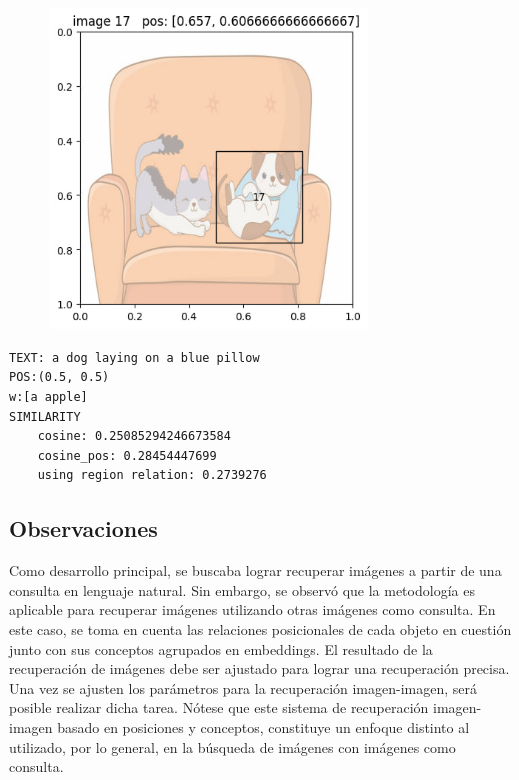 \begin{figure}[H]
\centering
 \includegraphics[height=85mm]{Graphics/dog_pillow.jpg}
 \caption{ }
 \label{fig:dogs_pillow}
\end{figure}
\begin{verbatim}
TEXT: a dog laying on a blue pillow
POS:(0.5, 0.5)
w:[a apple]
SIMILARITY
    cosine: 0.25085294246673584
    cosine_pos: 0.28454447699
    using region relation: 0.2739276
\end{verbatim}


\subsection{Observaciones}
Como desarrollo principal, se buscaba lograr recuperar im\'agenes a partir de una consulta en lenguaje natural. Sin embargo, se observó que la metodología es aplicable para recuperar im\'agenes utilizando otras im\'agenes como consulta. En este caso, se toma en cuenta las relaciones posicionales de cada objeto en cuestión junto con sus conceptos agrupados en embeddings. El resultado de la recuperación de im\'agenes debe ser ajustado para lograr una recuperación precisa. Una vez se ajusten los par\'ametros para la recuperación imagen-imagen, ser\'a posible realizar dicha tarea. N\'otese que este sistema de recuperaci\'on imagen-imagen basado en posiciones y conceptos, constituye un enfoque distinto al utilizado, por lo general, en la b\'usqueda de im\'agenes con im\'agenes como consulta.


